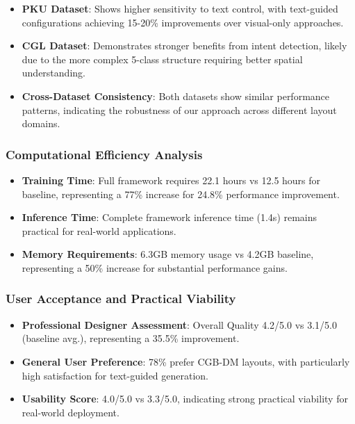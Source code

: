 \documentclass[journal,article,submit,pdftex,moreauthors]{Definitions/mdpi}
\begin{document}
\begin{itemize}
\item \textbf{PKU Dataset}: Shows higher sensitivity to text control, with text-guided configurations achieving 15-20\% improvements over visual-only approaches.

\item \textbf{CGL Dataset}: Demonstrates stronger benefits from intent detection, likely due to the more complex 5-class structure requiring better spatial understanding.

\item \textbf{Cross-Dataset Consistency}: Both datasets show similar performance patterns, indicating the robustness of our approach across different layout domains.
\end{itemize}

\subsubsection{Computational Efficiency Analysis}

\begin{itemize}
\item \textbf{Training Time}: Full framework requires 22.1 hours vs 12.5 hours for baseline, representing a 77\% increase for 24.8\% performance improvement.

\item \textbf{Inference Time}: Complete framework inference time (1.4s) remains practical for real-world applications.

\item \textbf{Memory Requirements}: 6.3GB memory usage vs 4.2GB baseline, representing a 50\% increase for substantial performance gains.
\end{itemize}

\subsubsection{User Acceptance and Practical Viability}

\begin{itemize}
\item \textbf{Professional Designer Assessment}: Overall Quality 4.2/5.0 vs 3.1/5.0 (baseline avg.), representing a 35.5\% improvement.

\item \textbf{General User Preference}: 78\% prefer CGB-DM layouts, with particularly high satisfaction for text-guided generation.

\item \textbf{Usability Score}: 4.0/5.0 vs 3.3/5.0, indicating strong practical viability for real-world deployment.
\end{itemize}
\end{document}
